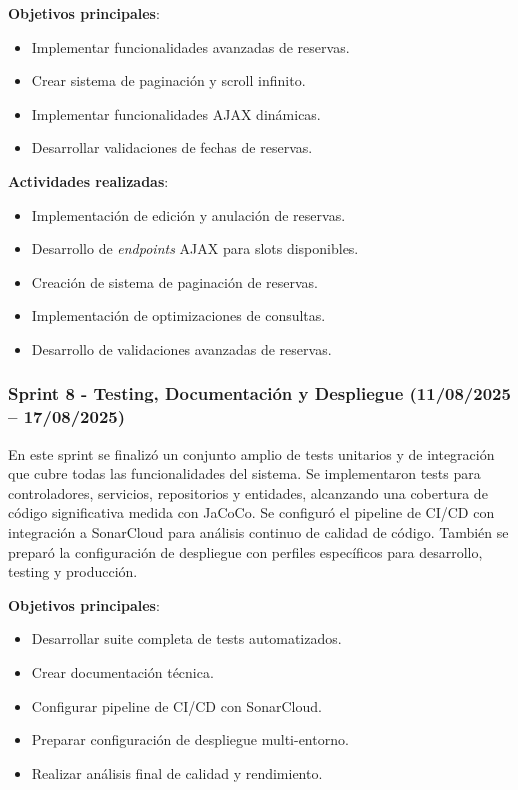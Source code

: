 \textbf{Objetivos principales}:
\begin{itemize}
\tightlist
\item
Implementar funcionalidades avanzadas de reservas.
\item
Crear sistema de paginación y scroll infinito.
\item
Implementar funcionalidades AJAX dinámicas.
\item
Desarrollar validaciones de fechas de reservas.
\end{itemize}

\textbf{Actividades realizadas}:
\begin{itemize}
\tightlist
\item
Implementación de edición y anulación de reservas.
\item
Desarrollo de \emph{endpoints} AJAX para slots disponibles.
\item
Creación de sistema de paginación de reservas.
\item
Implementación de optimizaciones de consultas.
\item
Desarrollo de validaciones avanzadas de reservas.
\end{itemize}

\subsubsection{Sprint 8 - Testing, Documentación y Despliegue (11/08/2025 – 17/08/2025)} 
En este sprint se finalizó un conjunto amplio de tests unitarios y de integración que cubre todas las funcionalidades del sistema. Se implementaron tests para controladores, servicios, repositorios y entidades, alcanzando una cobertura de código significativa medida con JaCoCo. Se configuró el pipeline de CI/CD con integración a SonarCloud para análisis continuo de calidad de código. También se preparó la configuración de despliegue con perfiles específicos para desarrollo, testing y producción.

\textbf{Objetivos principales}:
\begin{itemize}
\tightlist
\item
Desarrollar suite completa de tests automatizados.
\item
Crear documentación técnica.
\item
Configurar pipeline de CI/CD con SonarCloud.
\item
Preparar configuración de despliegue multi-entorno.
\item
Realizar análisis final de calidad y rendimiento.
\end{itemize}

